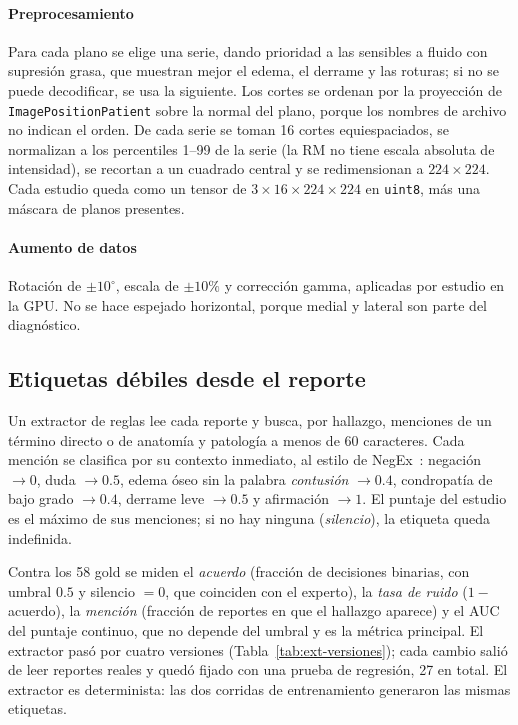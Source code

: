 \documentclass[conference]{IEEEtran}
\begin{document}
\paragraph*{Preprocesamiento}
Para cada plano se elige una serie, dando prioridad a las sensibles a fluido con supresión grasa, que muestran mejor el edema, el derrame y las roturas; si no se puede decodificar, se usa la siguiente.
Los cortes se ordenan por la proyección de \texttt{ImagePositionPatient} sobre la normal del plano, porque los nombres de archivo no indican el orden.
De cada serie se toman 16 cortes equiespaciados, se normalizan a los percentiles 1--99 de la serie (la RM no tiene escala absoluta de intensidad), se recortan a un cuadrado central y se redimensionan a $224\times224$.
Cada estudio queda como un tensor de $3\times16\times224\times224$ en \texttt{uint8}, más una máscara de planos presentes.

\paragraph*{Aumento de datos}
Rotación de $\pm10^\circ$, escala de $\pm10\%$ y corrección gamma, aplicadas por estudio en la GPU.
No se hace espejado horizontal, porque medial y lateral son parte del diagnóstico.

\subsection{Etiquetas débiles desde el reporte}
\label{sec:extractor}

Un extractor de reglas lee cada reporte y busca, por hallazgo, menciones de un término directo o de anatomía y patología a menos de 60 caracteres.
Cada mención se clasifica por su contexto inmediato, al estilo de NegEx~\cite{chapman2001negex}: negación $\rightarrow 0$, duda $\rightarrow 0.5$, edema óseo sin la palabra \emph{contusión} $\rightarrow 0.4$, condropatía de bajo grado $\rightarrow 0.4$, derrame leve $\rightarrow 0.5$ y afirmación $\rightarrow 1$.
El puntaje del estudio es el máximo de sus menciones; si no hay ninguna (\emph{silencio}), la etiqueta queda indefinida.

Contra los 58 gold se miden el \emph{acuerdo} (fracción de decisiones binarias, con umbral $0.5$ y silencio $=0$, que coinciden con el experto), la \emph{tasa de ruido} ($1-$acuerdo), la \emph{mención} (fracción de reportes en que el hallazgo aparece) y el AUC del puntaje continuo, que no depende del umbral y es la métrica principal.
El extractor pasó por cuatro versiones (Tabla~\ref{tab:ext-versiones}); cada cambio salió de leer reportes reales y quedó fijado con una prueba de regresión, 27 en total.
El extractor es determinista: las dos corridas de entrenamiento generaron las mismas etiquetas.
\end{document}
